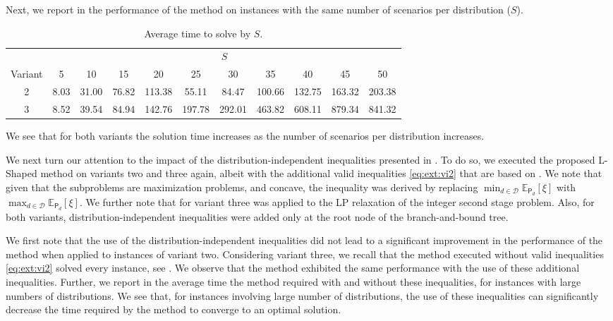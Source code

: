 \documentclass[12pt]{article}
\theoremstyle{thmstylethree}%
\newcommand{\mtc}[1] {\mathcal{#1}}
\newcommand{\pr}[1]{\ensuremath{\mathsf{#1}}}
\def\Ex{\ensuremath{\mathbb{E}}}
\begin{document}
Next, we report in  the performance of the method on instances with the same number of scenarios per distribution ($S$).
\begin{table}[htp]
\centering
\small
\caption{Average time to solve by $S$.}
\label{tbl:solve_num_s}
\begin{tabular}{|c|c|c|c|c|c|c|c|c|c|c|}
\hline
 & \multicolumn{10}{c|}{$S$} \\
Variant &  5 & 10 & 15 & 20 & 25 & 30 & 35 & 40 & 45 & 50 \\
\hline
2 &  8.03 & 31.00 & 76.82 & 113.38 & 55.11 & 84.47 & 100.66 & 132.75 & 163.32 & 203.38 \\
3 &  8.52 & 39.54 & 84.94 & 142.76 & 197.78 & 292.01 & 463.82 & 608.11 & 879.34 & 841.32 \\
\hline
\end{tabular}
\end{table}
We see that for both variants the solution time increases as the number of scenarios per distribution increases.


We next turn our attention to the impact of the distribution-independent inequalities presented in . To do so, we executed the proposed L-Shaped method on variants two and three again, albeit with the additional valid inequalities \eqref{eq:ext:vi2} that are based on . We note that given that the subproblems are maximization problems, and concave, the inequality was derived by replacing $\min_{d\in\mtc{D}}\Ex_{\pr{P}_d}[\xi]$ with $\max_{d\in\mtc{D}}\Ex_{\pr{P}_d}[\xi]$. We further note that for variant three  was applied to the LP relaxation of the integer second stage problem. Also, for both variants, distribution-independent inequalities were added only at the root node of the branch-and-bound tree.

We first note that the use of the distribution-independent inequalities did not lead to a significant improvement in the performance of the method when applied to instances of variant two.
Considering variant three, we recall that the method executed without valid inequalities \eqref{eq:ext:vi2} solved every instance, see .
We observe that the method exhibited the same performance with the use of these additional inequalities.
Further, we report in  the average time the method required with and without these inequalities, for instances with large numbers of distributions.
We see that, for instances involving large number of distributions, the use of these inequalities can significantly decrease the time required by the method to converge to an optimal solution.
\end{document}
